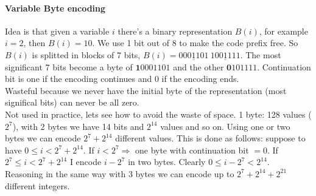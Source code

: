 \documentclass[10pt]{report}
\begin{document}
\paragraph{Variable Byte encoding} Idea is that given a variable $i$ there's a binary representation $B(i)$, for example $i = 2$, then $B(i) = 10$. We use 1 bit out of 8 to make the code prefix free. So $B(i)$ is splitted in blocks of 7 bits, $B(i) = \underline{\textit{000}1101}\:\underline{1001111}$. The most significant 7 bits become a byte of $\textbf{1}0001101$ and the other $\textbf{0}101111$. Continuation bit is one if the encoding continues and 0 if the encoding ends.\\
Wasteful because we never have the initial byte of the representation (most significal bits) can never be all zero.\\
Not used in practice, lets see how to avoid the waste of space. 1 byte: 128 values ($2^7$), with 2 bytes we have 14 bits and $2^{14}$ values and so on. Using one or two bytes we can encode $2^7 + 2^{14}$ different values. This is done as follows: suppose to have $0\leq i < 2^7 + 2^{14}$. If $i < 2^7 \Rightarrow$ one byte with continuation bit $= 0$. If $2^7 \leq i < 2^7 + 2^{14}$ I encode $i-2^7$ in two bytes. Clearly $0\leq i - 2^7 < 2^{14}$.\\
Reasoning in the same way with 3 bytes we can encode up to $2^7 + 2^{14} + 2^{21}$ different integers.
\end{document}

